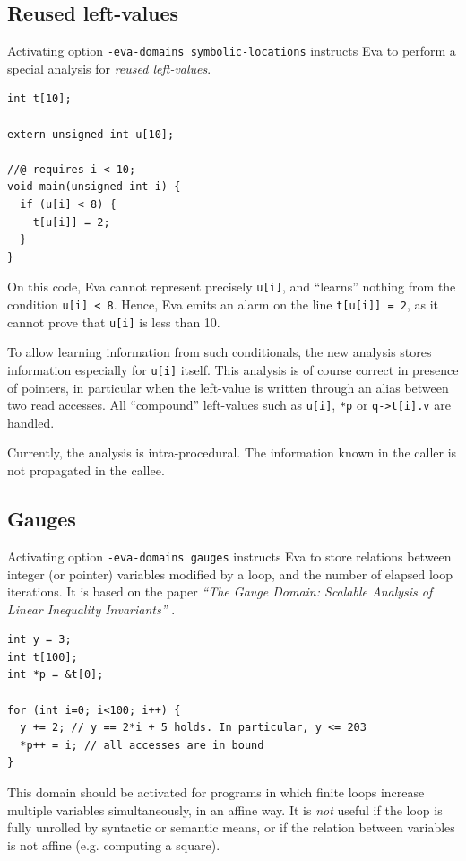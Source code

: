\documentclass[web]{frama-c-book}
\newcommand{\Eva}{\textsf{Eva}}
\begin{document}
\subsection{Reused left-values}
\label{sec:reuse}

Activating option \texttt{-eva-domains symbolic-locations} instructs
\Eva{} to perform a special analysis for \emph{reused left-values}.

\begin{lstlisting}
int t[10];

extern unsigned int u[10];

//@ requires i < 10;
void main(unsigned int i) {
  if (u[i] < 8) {
    t[u[i]] = 2;
  }
}
\end{lstlisting}
On this code, \Eva{} cannot represent precisely \lstinline+u[i]+, and
``learns'' nothing from the condition \lstinline+u[i] < 8+. Hence, \Eva{}
emits an alarm on the line \lstinline|t[u[i]] = 2|, as it cannot prove
that \lstinline+u[i]+ is less than 10.

To allow learning information from such conditionals,
the new analysis stores information especially for \texttt{u[i]} itself.
This analysis is of course correct in presence of pointers, in particular
when the left-value is written through an alias between two read accesses.
All ``compound'' left-values such as \texttt{u[i]}, \texttt{*p} or
\texttt{q->t[i].v} are handled.

Currently, the analysis is intra-procedural. The information known
in the caller is not propagated in the callee.

\subsection{Gauges}
\label{sec:gauges}

Activating option \texttt{-eva-domains gauges} instructs \Eva{} to
store relations between integer (or pointer) variables modified by a
loop, and the number of elapsed loop iterations. It is based on the
paper \emph{``The Gauge Domain: Scalable Analysis of Linear
Inequality Invariants''}
\cite{DBLP:conf/cav/Venet12}.


\begin{lstlisting}
int y = 3;
int t[100];
int *p = &t[0];

for (int i=0; i<100; i++) {
  y += 2; // y == 2*i + 5 holds. In particular, y <= 203
  *p++ = i; // all accesses are in bound
}
\end{lstlisting}

This domain should be activated for programs in which finite loops
increase multiple variables simultaneously, in an affine way. It
is \emph{not} useful if the loop is fully unrolled by syntactic or
semantic means, or if the relation between
variables is not affine (e.g. computing a square).
\end{document}
